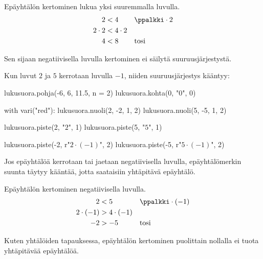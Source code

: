 \begin{esimerkki}
Epäyhtälön kertominen lukua yksi suuremmalla luvulla.
\begin{align*}
     2 &< 4 && \ppalkki \cdot 2 \\
   2\cdot 2 &< 4\cdot 2  \\
     4 &< 8 && \textrm{tosi}
\end{align*}
\end{esimerkki}

Sen sijaan negatiivisella luvulla kertominen ei säilytä suuruusjärjestystä.

\begin{esimerkki}
Kun luvut $2$ ja $5$ kerrotaan luvulla $-1$, niiden suuruusjärjestys kääntyy:

\begin{kuva}
lukusuora.pohja(-6, 6, 11.5, n = 2)
lukusuora.kohta(0, "$0$", 0)

with vari("red"):
	lukusuora.nuoli(2, -2, 1, 2)
	lukusuora.nuoli(5, -5, 1, 2)

lukusuora.piste(2, "$2$", 1)
lukusuora.piste(5, "$5$", 1)

lukusuora.piste(-2, r"$2 \cdot (-1)$", 2)
lukusuora.piste(-5, r"$5 \cdot (-1)$", 2)
\end{kuva}
\end{esimerkki}

Jos epäyhtälöä kerrotaan tai jaetaan negatiivisella luvulla, epäyhtälömerkin suunta täytyy kääntää, jotta saataisiin yhtäpitävä epäyhtälö.

\begin{esimerkki}
Epäyhtälön kertominen negatiivisella luvulla.
\begin{align*}
     2 &< 5 && \ppalkki \cdot (-1) \\
   2\cdot (-1) &> 4\cdot (-1)  \\
     -2 &> -5 && \textrm{tosi}
\end{align*}
\end{esimerkki}


Kuten yhtälöiden tapauksessa, epäyhtälön kertominen puolittain nollalla ei tuota yhtäpitävää epäyhtälöä.


